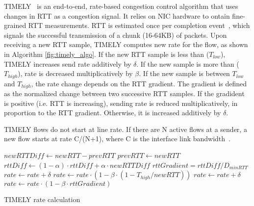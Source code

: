 TIMELY~\cite{timely} is an end-to-end, rate-based congestion control algorithm
that uses changes in RTT as a congestion signal.  It relies on NIC hardware to
ontain fine-grained RTT measurements. RTT is estimated once per completion
event~\cite{rocev2}, which signals the successful transmission of a chunk
(16-64KB) of packets. Upon receiving a new RTT sample, TIMELY computes new rate
for the flow, as shown in Algorithm \ref{fig:timely_algo}.  If the new RTT
sample is less than ($T_{low}$), TIMELY increases send rate additively by
$\delta$. If the new sample is more than ($T_{high}$), rate is decreased
multiplicatively by $\beta$. If the new sample is between $T_{low}$ and
$T_{high}$, the rate change depends on the RTT gradient. The gradient is defined
as the normalized change between two successive RTT samples. If the gradident is
positive (i.e. RTT is increasing), sending rate is reduced multiplicatively, in
proportion to the RTT gradient.  Otherwise, it is increased additively by
$\delta$.

TIMELY flows do not start at line rate. If there are N active flows at a sender,
a new flow starts at rate C/(N+1), where C is the interface link
bandwidth~\cite{timely-private}.

\begin{algorithm}[t]
\footnotesize
{
\begin{algorithmic}[1]
\State $newRTTDiff \gets newRTT - prevRTT$
\State $prevRTT \gets newRTT$
\State $rttDiff \gets (1-\alpha) \cdot rttDiff + \alpha \cdot newRTTDiff$
\State $rttGradient = rttDiff/D_{minRTT}$
        \State $rate \gets rate + \delta$
        \State $rate \gets rate \cdot  (1 - \beta \cdot (1 - T_{high}/newRTT))$
        \State $rate \gets rate + \delta$
\Else
        \State $rate \gets rate \cdot (1 - \beta \cdot rttGradient)$
\EndIf 
\end{algorithmic}
}
\caption{TIMELY rate calculation}
\label{fig:timely_algo}
\end{algorithm}

